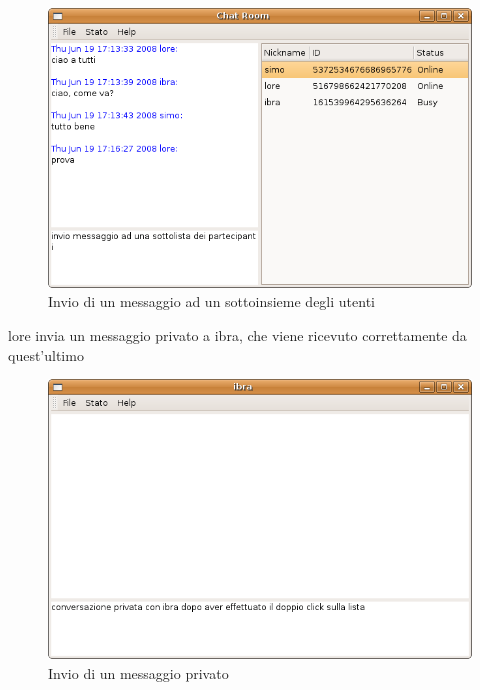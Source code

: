 \begin{figure}[H]
\begin{center}
\includegraphics[scale=0.5]{etc/invio_sottolista.png}
\caption{Invio di un messaggio ad un sottoinsieme degli utenti}
\label{inviosottolista}
\end{center}
\end{figure}
lore invia un messaggio privato a ibra, che viene ricevuto correttamente da quest'ultimo
\begin{figure}[H]
\begin{center}
\includegraphics[scale=0.5]{etc/pm_ibra.png}
\caption{Invio di un messaggio privato}
\label{pmibra}
\end{center}
\end{figure}
